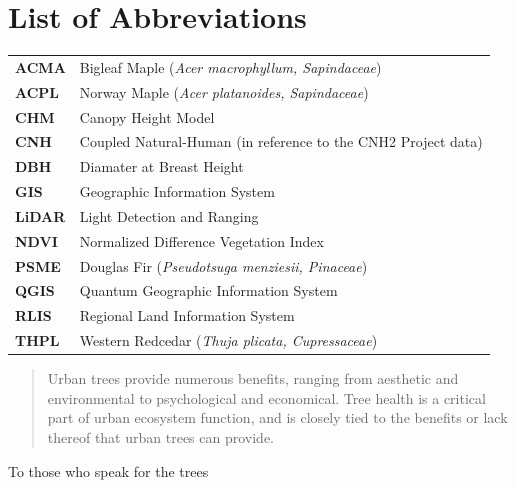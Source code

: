 \documentclass[12pt,twoside]{reedthesis}
\begin{document}
\chapter*{List of Abbreviations}
\begin{table}[h]
    \centering
    \begin{tabular}{ll}
                \textbf{ACMA} & Bigleaf Maple (\textit{Acer macrophyllum, Sapindaceae}) \\
                \textbf{ACPL} & Norway Maple (\textit{Acer platanoides, Sapindaceae}) \\
                \textbf{CHM} & Canopy Height Model \\
                \textbf{CNH} & Coupled Natural-Human (in reference to the CNH2 Project data) \\
                \textbf{DBH} & Diamater at Breast Height \\
                \textbf{GIS} & Geographic Information System \\
                \textbf{LiDAR} & Light Detection and Ranging \\
                \textbf{NDVI} & Normalized Difference Vegetation Index \\
                \textbf{PSME} & Douglas Fir (\textit{Pseudotsuga menziesii, Pinaceae}) \\
                \textbf{QGIS} & Quantum Geographic Information System \\
                \textbf{RLIS} & Regional Land Information System \\
                \textbf{THPL} & Western Redcedar (\textit{Thuja plicata, Cupressaceae}) \\
            \end{tabular}
\end{table}
  \hypersetup{linkcolor=black}
  \setcounter{secnumdepth}{2}
  \setcounter{tocdepth}{2}
  \tableofcontents

  \listoftables

  \listoffigures
  \begin{abstract}
    Urban trees provide numerous benefits, ranging from aesthetic and environmental to psychological and economical. Tree health is a critical part of urban ecosystem function, and is closely tied to the benefits or lack thereof that urban trees can provide.
  \end{abstract}
  \begin{dedication}
    To those who speak for the trees
  \end{dedication}
\mainmatter %
\pagestyle{fancyplain} %
\end{document}
